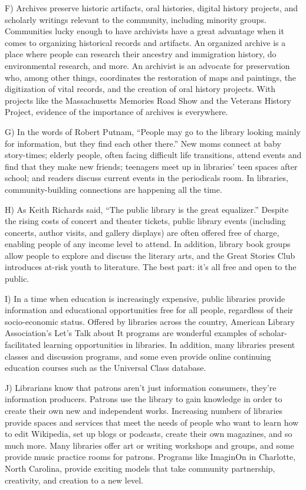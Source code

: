 \documentclass[UTF8,11pt]{ctexart}
\begin{document}
F) Archives preserve historic artifacts, oral histories, digital history projects, and scholarly writings relevant to the community, including minority groups. Communities lucky enough to have archivists have a great advantage when it comes to organizing historical records and artifacts. An organized archive is a place where people can research their ancestry and immigration history, do environmental research, and more. An archivist is an advocate for preservation who, among other things, coordinates the restoration of maps and paintings, the digitization of vital records, and the creation of oral history projects. With projects like the Massachusetts Memories Road Show and the Veterans History Project, evidence of the importance of archives is everywhere.


G) In the words of Robert Putnam, “People may go to the library looking mainly for information, but they find each other there.” New moms connect at baby story-times; elderly people, often facing difficult life transitions, attend events and find that they make new friends; teenagers meet up in libraries’ teen spaces after school; and readers discuss current events in the periodicals room. In libraries, community-building connections are happening all the time.


H) As Keith Richards said, “The public library is the great equalizer.” Despite the rising costs of concert and theater tickets, public library events (including concerts, author visits, and gallery displays) are often offered free of charge, enabling people of any income level to attend. In addition, library book groups allow people to explore and discuss the literary arts, and the Great Stories Club introduces at-risk youth to literature. The best part: it’s all free and open to the public.


I) In a time when education is increasingly expensive, public libraries provide information and educational opportunities free for all people, regardless of their socio-economic status. Offered by libraries across the country, American Library Association’s Let’s Talk about It programs are wonderful examples of scholar-facilitated learning opportunities in libraries. In addition, many libraries present classes and discussion programs, and some even provide online continuing education courses such as the Universal Class database.


J) Librarians know that patrons aren’t just information consumers, they’re information producers. Patrons use the library to gain knowledge in order to create their own new and independent works. Increasing numbers of libraries provide spaces and services that meet the needs of people who want to learn how to edit Wikipedia, set up blogs or podcasts, create their own magazines, and so much more. Many libraries offer art or writing workshops and groups, and some provide music practice rooms for patrons. Programs like ImaginOn in Charlotte, North Carolina, provide exciting models that take community partnership, creativity, and creation to a new level.
\end{document}
